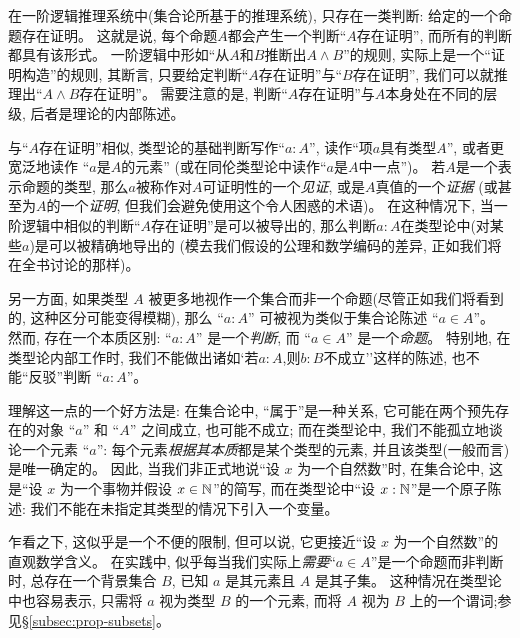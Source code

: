 在一阶逻辑推理系统中(集合论所基于的推理系统), 只存在一类判断: 给定的一个命题存在证明。
这就是说, 每个命题$A$都会产生一个判断``$A$存在证明'', 而所有的判断都具有该形式。
一阶逻辑中形如``从$A$和$B$推断出$A \wedge B$''的规则, 实际上是一个``证明构造''的规则,
其断言, 只要给定判断``$A$存在证明''与``$B$存在证明'', 我们可以就推理出``$A \wedge B$存在证明''。
需要注意的是, 判断``$A$存在证明''与$A$本身处在不同的层级, 后者是理论的内部陈述。

与``$A$存在证明''相似, 类型论的基础判断写作``$a:A$'', 读作``项$a$具有类型$A$'',
或者更宽泛地读作 ``$a$是$A$的元素'' (或在同伦类型论中读作``$a$是$A$中一点'')。
%
%
%
若$A$是一个表示命题的类型, 那么$a$被称作对$A$可证明性的一个\emph{见证},
或是$A$真值的一个\emph{证据}
(或甚至为$A$的一个\emph{证明}, 但我们会避免使用这个令人困惑的术语)。
在这种情况下, 当一阶逻辑中相似的判断``$A$存在证明''是可以被导出的, 那么判断$a:A$在类型论中(对某些$a$)是可以被精确地导出的
(模去我们假设的公理和数学编码的差异, 正如我们将在全书讨论的那样)。

另一方面, 如果类型 $A$ 被更多地视作一个集合而非一个命题(尽管正如我们将看到的, 这种区分可能变得模糊), 
那么 ``$a:A$'' 可被视为类似于集合论陈述 ``$a\in A$''。
然而, 存在一个本质区别: ``$a:A$'' 是一个\emph{判断}, 而 ``$a\in A$'' 是一个\emph{命题}。
特别地, 在类型论内部工作时, 我们不能做出诸如`若$a:A$,则$b:B$不成立''这样的陈述, 也不能``反驳''判断 ``$a:A$''。

理解这一点的一个好方法是: 在集合论中, ``属于''是一种关系, 它可能在两个预先存在的对象 ``$a$'' 和 ``$A$'' 之间成立, 也可能不成立;
而在类型论中, 我们不能孤立地谈论一个元素 ``$a$'': 每个元素\emph{根据其本质}都是某个类型的元素, 并且该类型(一般而言)是唯一确定的。
因此, 当我们非正式地说``设 $x$ 为一个自然数''时, 在集合论中, 这是``设 $x$ 为一个事物并假设 $x\in\mathbb{N}$''的简写, 
而在类型论中``设 $x:\mathbb{N}$''是一个原子陈述: 我们不能在未指定其类型的情况下引入一个变量。

乍看之下, 这似乎是一个不便的限制, 但可以说, 它更接近``设 $x$ 为一个自然数''的直观数学含义。
在实践中, 似乎每当我们实际上\emph{需要}``$a\in A$''是一个命题而非判断时, 
总存在一个背景集合 $B$, 已知 $a$ 是其元素且 $A$ 是其子集。
这种情况在类型论中也容易表示, 只需将 $a$ 视为类型 $B$ 的一个元素, 而将 $A$ 视为 $B$ 上的一个谓词;参见\S\ref{subsec:prop-subsets}。

